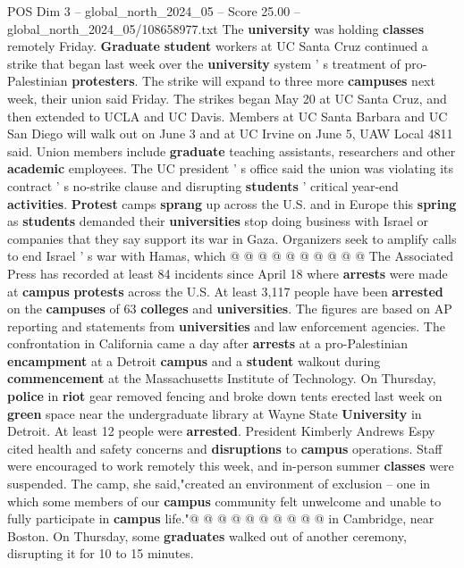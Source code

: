 \begin{textsample}{POS Dim 3 – global\_north\_2024\_05 – Score 25.00 – global\_north\_2024\_05/108658977.txt}
The \textbf{university} was holding \textbf{classes} remotely Friday. \textbf{Graduate} \textbf{student} workers at UC Santa Cruz continued a strike that began last week over the \textbf{university} system ' s treatment of pro-Palestinian \textbf{protesters}.
The strike will expand to three more \textbf{campuses} next week, their union said Friday.
The strikes began May 20 at UC Santa Cruz, and then extended to UCLA and UC Davis.
Members at UC Santa Barbara and UC San Diego will walk out on June 3 and at UC Irvine on June 5, UAW Local 4811 said.
Union members include \textbf{graduate} teaching assistants, researchers and other \textbf{academic} employees.
The UC president ' s office said the union was violating its contract ' s no-strike clause and disrupting \textbf{students} ' critical year-end \textbf{activities}. \textbf{Protest} camps \textbf{sprang} up across the U.S. and in Europe this \textbf{spring} as \textbf{students} demanded their \textbf{universities} stop doing business with Israel or companies that they say support its war in Gaza.
Organizers seek to amplify calls to end Israel ' s war with Hamas, which @ @ @ @ @ @ @ @ @ @ The Associated Press has recorded at least 84 incidents since April 18 where \textbf{arrests} were made at \textbf{campus} \textbf{protests} across the U.S.
At least 3,117 people have been \textbf{arrested} on the \textbf{campuses} of 63 \textbf{colleges} and \textbf{universities}.
The figures are based on AP reporting and statements from \textbf{universities} and law enforcement agencies.
The confrontation in California came a day after \textbf{arrests} at a pro-Palestinian \textbf{encampment} at a Detroit \textbf{campus} and a \textbf{student} walkout during \textbf{commencement} at the Massachusetts Institute of Technology.
On Thursday, \textbf{police} in \textbf{riot} gear removed fencing and broke down tents erected last week on \textbf{green} space near the undergraduate library at Wayne State \textbf{University} in Detroit.
At least 12 people were \textbf{arrested}.
President Kimberly Andrews Espy cited health and safety concerns and \textbf{disruptions} to \textbf{campus} operations.
Staff were encouraged to work remotely this week, and in-person summer \textbf{classes} were suspended.
The camp, she said,"created an environment of exclusion -- one in which some members of our \textbf{campus} community felt unwelcome and unable to fully participate in \textbf{campus} life."@ @ @ @ @ @ @ @ @ @ in Cambridge, near Boston.
On Thursday, some \textbf{graduates} walked out of another ceremony, disrupting it for 10 to 15 minutes.

\end{textsample}
